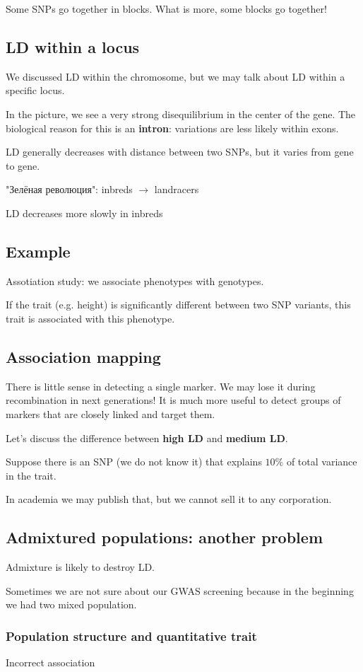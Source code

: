 \documentclass[main.tex]{subfiles}
\begin{document}
Some SNPs go together in blocks.
What is more, some blocks go together!

\subsection{LD within a locus}

We discussed LD within the chromosome, but we may talk about LD within a specific locus.

In the picture, we see a very strong disequilibrium in the center of the gene.
The biological reason for this is an \textbf{intron}: variations are less likely within exons.

LD generally decreases with distance between two SNPs, but it varies from gene to gene.

\begin{leftbar}
    "Зелёная революция": inbreds $ \rightarrow $ landracers
\end{leftbar}

LD decreases more slowly in inbreds

\subsection{Example}

Assotiation study: we associate phenotypes with genotypes.

If the trait (e.g. height) is significantly different between two SNP variants, this trait is associated with this phenotype.

\subsection{Association mapping}

There is little sense in detecting a single marker.
We may lose it during recombination in next generations!
It is much more useful to detect groups of markers that are closely linked and target them.

Let's discuss the difference between \textbf{high LD} and \textbf{medium LD}.

Suppose there is an SNP (we do not know it) that explains $ 10 \% $ of total variance in the trait.


In academia we may publish that, but we cannot sell it to any corporation.

\subsection{Admixtured populations: another problem}
Admixture is likely to destroy LD.

Sometimes we are not sure about our GWAS screening because in the beginning we had two mixed population.


\subsubsection{Population structure and quantitative trait}

Incorrect association %
\end{document}
